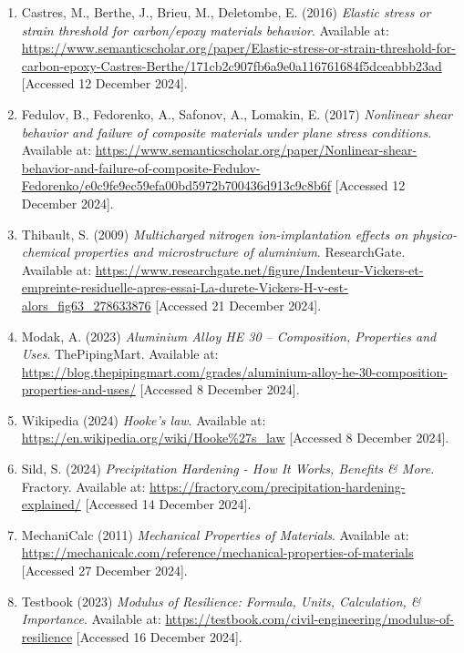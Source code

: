 \documentclass{article}
\begin{document}
{\begin{enumerate}
    \item Castres, M., Berthe, J., Brieu, M., Deletombe, E. (2016) \textit{Elastic stress or strain threshold for carbon/epoxy materials behavior}. Available at: \url{https://www.semanticscholar.org/paper/Elastic-stress-or-strain-threshold-for-carbon-epoxy-Castres-Berthe/171cb2c907fb6a9e0a116761684f5dceabbb23ad} [Accessed 12 December 2024].
    
    \item Fedulov, B., Fedorenko, A., Safonov, A., Lomakin, E. (2017) \textit{Nonlinear shear behavior and failure of composite materials under plane stress conditions}. Available at: \url{https://www.semanticscholar.org/paper/Nonlinear-shear-behavior-and-failure-of-composite-Fedulov-Fedorenko/e0c9fe9ec59efa00bd5972b700436d913c9c8b6f} [Accessed 12 December 2024].
    
    \item Thibault, S. (2009) \textit{Multicharged nitrogen ion-implantation effects on physico-chemical properties and microstructure of aluminium}. ResearchGate. Available at: \url{https://www.researchgate.net/figure/Indenteur-Vickers-et-empreinte-residuelle-apres-essai-La-durete-Vickers-H-v-est-alors_fig63_278633876} [Accessed 21 December 2024].
    
    \item Modak, A. (2023) \textit{Aluminium Alloy HE 30 – Composition, Properties and Uses}. ThePipingMart. Available at: \url{https://blog.thepipingmart.com/grades/aluminium-alloy-he-30-composition-properties-and-uses/} [Accessed 8 December 2024].
    
    \item Wikipedia (2024) \textit{Hooke's law}. Available at: \url{https://en.wikipedia.org/wiki/Hooke\%27s_law} [Accessed 8 December 2024].
    
    \item Sild, S. (2024) \textit{Precipitation Hardening - How It Works, Benefits \& More}. Fractory. Available at: \url{https://fractory.com/precipitation-hardening-explained/} [Accessed 14 December 2024].
    
    \item MechaniCalc (2011) \textit{Mechanical Properties of Materials}. Available at: \url{https://mechanicalc.com/reference/mechanical-properties-of-materials} [Accessed 27 December 2024].
    
    \item Testbook (2023) \textit{Modulus of Resilience: Formula, Units, Calculation, \& Importance}. Available at: \url{https://testbook.com/civil-engineering/modulus-of-resilience} [Accessed 16 December 2024].
    

\end{enumerate}}
\end{document}
